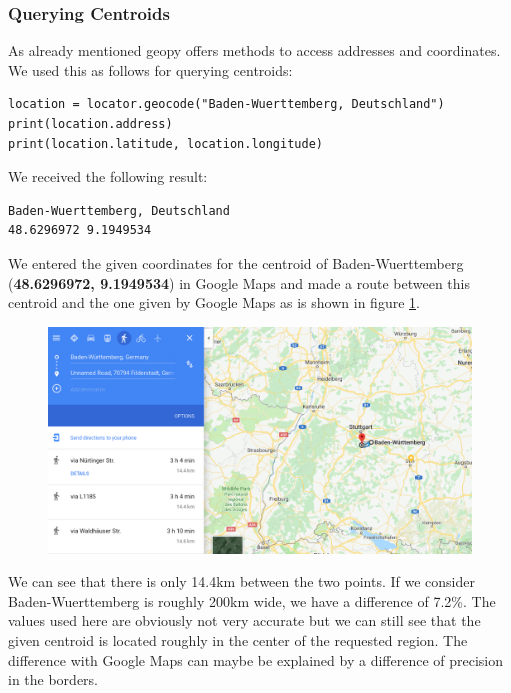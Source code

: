 \documentclass[12pt]{article}
\begin{document}
\subsubsection{Querying Centroids}
As already mentioned geopy offers methods to access addresses and coordinates. We used this as follows for querying centroids:
\begin{lstlisting}[breaklines=true]
location = locator.geocode("Baden-Wuerttemberg, Deutschland")
print(location.address)
print(location.latitude, location.longitude)
\end{lstlisting}
We received the following result:
\begin{lstlisting}[language=bash,breaklines=true]
Baden-Wuerttemberg, Deutschland
48.6296972 9.1949534
\end{lstlisting}
We entered the given coordinates for the centroid of Baden-Wuerttemberg (\textbf{48.6296972, 9.1949534}) in Google Maps and made a route between this centroid and the one given by Google Maps as is shown in figure \ref{fig:centroid}.
\begin{figure}[H]
\includegraphics[width=1.0\textwidth]{img/centroid}
\label{fig:centroid}
\end{figure}
We can see that there is only 14.4km between the two points. If we consider Baden-Wuerttemberg is roughly
200km wide, we have a difference of 7.2\%.
The values used here are obviously not very accurate but we can still see that the given centroid is located roughly in the center of the requested region.
The difference with Google Maps can maybe be explained by a difference of precision in the borders.
\end{document}
